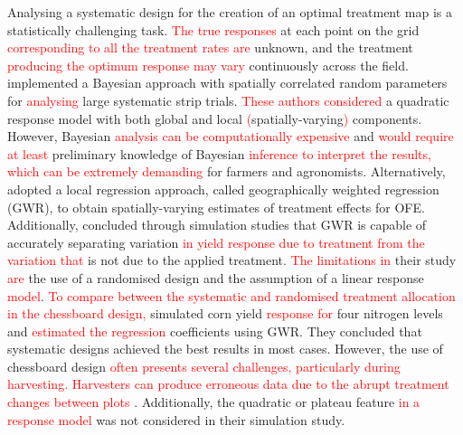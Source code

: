 \documentclass[a4paper]{article} 	%
\newcommand{\revision}[1]{\textcolor{red}{#1}}
\newcommand{\zc}[1]{\textcolor{red}{#1}}
\begin{document}
Analysing a systematic design for the creation of an optimal treatment map is a statistically challenging task. \revision{The true responses} at each point on the grid \revision{corresponding to all the treatment rates are} unknown, and the treatment \revision{producing the optimum response may vary} continuously across the field. \textcite{Cao2022Bayesian} implemented a Bayesian approach with spatially correlated random parameters for \revision{analysing} large systematic strip trials.
\revision{These authors considered} a quadratic response model with both global and local \revision{(}spatially-varying\revision{)} components. However, Bayesian \revision{analysis can be computationally expensive} and \revision{would require at least} preliminary knowledge of Bayesian \revision{inference to interpret the results, which can be extremely demanding} for farmers and agronomists. Alternatively, \textcite{Rakshit2020Novel} adopted a local regression approach, called geographically weighted regression (GWR), to obtain spatially-varying estimates of treatment effects for OFE. Additionally, \textcite{Evans2020Assessment} concluded through simulation studies that GWR is capable of accurately separating variation \revision{in yield response due to treatment from} \revision{the variation that} is not due to the applied treatment. \zc{The limitations in} their study \zc{are} the use of a randomised design and the assumption of a linear response \revision{model}. \revision{To compare between the systematic and randomised treatment allocation in the chessboard design,} \textcite{Alesso2021Design} simulated corn yield \revision{response} \revision{for} four nitrogen levels and \revision{estimated the regression} coefficients using GWR. They concluded that systematic designs achieved the best results in most cases. However, the use of chessboard design \revision{often presents several challenges, particularly during harvesting. Harvesters can produce erroneous data due to the abrupt treatment changes between plots} \parencite{Pringle2004FieldScale}. Additionally, the quadratic or plateau feature \revision{in a response model} was not considered in their simulation study.

\end{document}
